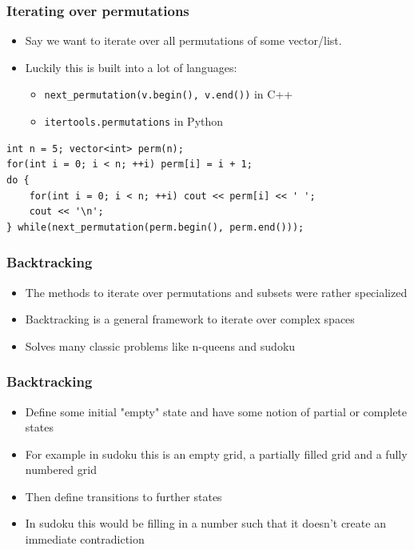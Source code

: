 \documentclass{beamer}
\begin{document}
\begin{frame}
	\frametitle{Iterating over permutations}
	\begin{itemize}
		 \item Say we want to iterate over all permutations of some vector/list.
		 \item Luckily this is built into a lot of languages:
		 \begin{itemize}
		 	\item \texttt{next\_permutation(v.begin(), v.end())} in C++
		 	\item \texttt{itertools.permutations} in Python
		 \end{itemize}
	\end{itemize}
	\begin{verbatim}
int n = 5; vector<int> perm(n);
for(int i = 0; i < n; ++i) perm[i] = i + 1;
do {
	for(int i = 0; i < n; ++i) cout << perm[i] << ' ';
	cout << '\n';
} while(next_permutation(perm.begin(), perm.end()));
\end{verbatim}
\end{frame}

\begin{frame}[plain]
	\frametitle{Backtracking}
	\begin{itemize}
		 \item The methods to iterate over permutations and subsets were rather specialized
		 \item Backtracking is a general framework to iterate over complex spaces
		 \item Solves many classic problems like n-queens and sudoku
	\end{itemize}
\end{frame}

\begin{frame}[plain]
	\frametitle{Backtracking}
	\begin{itemize}
		 \item Define some initial "empty" state and have some notion of partial or complete states
		 \item For example in sudoku this is an empty grid, a partially filled grid and a fully numbered grid
		 \item Then define transitions to further states
		 \item In sudoku this would be filling in a number such that it doesn't create an immediate contradiction
	\end{itemize}
\end{frame}
\end{document}
